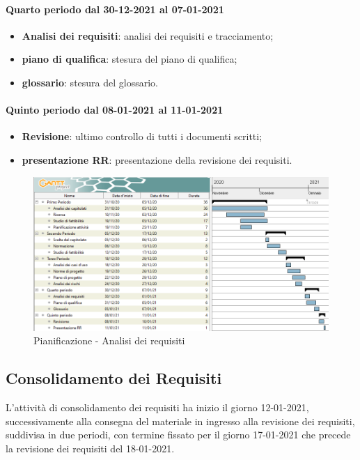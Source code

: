 \paragraph{Quarto periodo dal 30-12-2021 al 07-01-2021} 
\begin{itemize} 
	\item \textbf{Analisi dei requisiti}: analisi dei requisiti e tracciamento; 
	\item \textbf{piano di qualifica}: stesura del piano di qualifica; 
	\item \textbf{glossario}: stesura del glossario. 
\end{itemize} 

\paragraph{Quinto periodo dal 08-01-2021 al 11-01-2021} 
\begin{itemize} 
	\item \textbf{Revisione}: ultimo controllo di tutti i documenti scritti; 
	\item \textbf{presentazione RR}: presentazione della revisione dei requisiti. 
\end{itemize} 


\newpage 

\begin{landscape} 
	\begin{figure}[h!] 
		\includegraphics[width=24cm]{images/1_Analisi_dei_requisiti.png} 
		\caption{Pianificazione - Analisi dei requisiti} 
	\end{figure} 
\end{landscape} 

\newpage 

\subsection{Consolidamento dei Requisiti} 
L'attività di consolidamento dei requisiti ha inizio il giorno 12-01-2021, successivamente alla consegna del materiale in ingresso alla revisione dei requisiti, suddivisa in due periodi, con termine fissato 
per il giorno 17-01-2021 che precede la revisione dei requisiti del 18-01-2021. 


